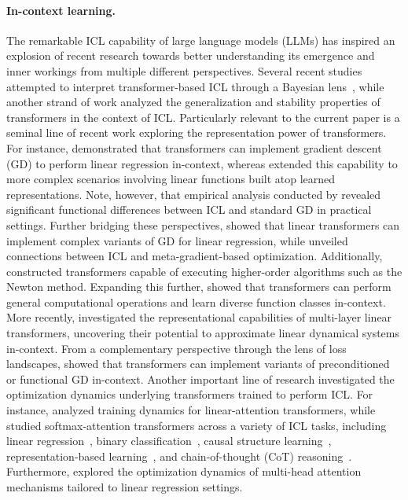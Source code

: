 \documentclass[english]{article}
\begin{document}
\paragraph{In-context learning.} The remarkable  ICL capability of large language models (LLMs) has inspired an explosion of recent research towards better understanding its emergence and inner workings from multiple different perspectives. Several recent studies attempted to interpret transformer-based ICL through a Bayesian lens~\citep{xie2022explanation,ahuja2023context,zhang2023and,hahn2023theory}, while another strand of work \citep{li2023transformers,kwon2025out,cole2024provable} analyzed the generalization and stability properties of transformers in the context of ICL. Particularly relevant to the current paper is a seminal line of recent work exploring the representation power of transformers. For instance, \citet{akyurek2023learning,bai2023transformers,von2023transformers} demonstrated that transformers can implement gradient descent (GD) to perform linear regression in-context, whereas \citet{guo2024transformers} extended this capability to more complex scenarios involving linear functions built atop learned representations. Note, however, that empirical analysis conducted by \citet{shen2023pretrained} revealed significant functional differences between ICL and standard GD in practical settings. Further bridging these perspectives, \citet{vladymyrov2024linear} showed that linear transformers can implement complex variants of GD for linear regression, while \citet{von2023uncovering,dai2022can} unveiled connections between ICL and meta-gradient-based optimization. Additionally, \citet{fu2024transformers,giannou2023looped} constructed transformers capable of executing higher-order algorithms such as the Newton method. Expanding this further, \citet{giannou2024transformersemulateincontextnewtons,furuya2024transformers,wang2024incontext} showed that transformers can perform general computational operations and learn diverse function classes in-context. More recently, \citet{cole2025context} investigated the representational capabilities of multi-layer linear transformers, uncovering their potential to approximate linear dynamical systems in-context.
From a complementary perspective through the lens of loss landscapes, \citet{ahn2023transformers,mahankali2024one,cheng2024transformers} showed that transformers can implement variants of preconditioned or functional GD in-context. Another important line of research investigated the optimization dynamics underlying transformers trained to perform ICL. For instance, \citet{zhang2024trained,kim2024transformers} analyzed training dynamics for linear-attention transformers, while \citet{huang2024context,li2024training,nichani2024transformers,yang2024context} studied softmax-attention transformers across a variety of ICL tasks, including linear regression~\citep{huang2024context}, binary classification~\citep{li2024training}, causal structure learning~\citep{nichani2024transformers}, representation-based learning~\citep{yang2024context}, and chain-of-thought (CoT) reasoning~\citep{huang2025cot}. Furthermore, \citet{chen2024training} explored the optimization dynamics of multi-head attention mechanisms tailored to linear regression settings.
\end{document}

